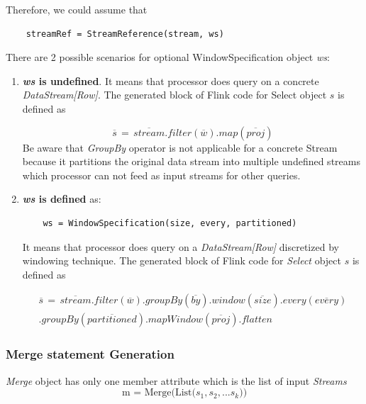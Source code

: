 Therefore, we could assume that
\begin{lstlisting}
	streamRef = StreamReference(stream, ws)
\end{lstlisting}

There are 2 possible scenarios for optional WindowSpecification object \textit{ws}:
\begin{enumerate}
	\item \textbf{\textit{ws} is undefined}. It means that processor does query on a concrete \textit{DataStream[Row]}.  The generated block of Flink code for Select object $s$ is defined as
	
	\begin{equation}
	\overline{s}\, =\,\overline{stream} .filter(\overline{w}).map(\overline{proj})
\end{equation}
	Be aware that \textit{GroupBy} operator is not applicable for a concrete Stream because it partitions the original data stream into multiple undefined streams which processor can not feed as input streams for other queries. 
	
	\item \textbf{\textit{ws} is defined} as:
		\begin{lstlisting} 
	ws = WindowSpecification(size, every, partitioned)
\end{lstlisting}
It means that processor does query on a \textit{DataStream[Row]} discretized by windowing technique. The generated block of Flink code for \textit{Select} object $s$ is defined as


\begin{multline}
	\overline{s}\, =\,\overline{stream} .filter(\overline{w}).groupBy(\overline{by})	.window(\overline{size}).every(\overline{every}) \\
	.groupBy(\overline{partitioned}).mapWindow(\overline{proj}).flatten
\end{multline} 


	
\end{enumerate}


\subsubsection*{Merge statement Generation}

\textit{Merge} object has only one member attribute which is the list of input \textit{Streams}
\begin{equation}
	\textrm{m = Merge(List(} s_1, s_2, ...s_k \textrm{))}
\end{equation}

